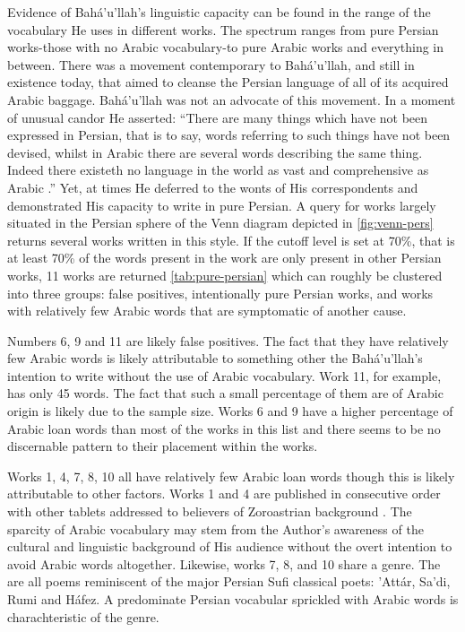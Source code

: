 \documentclass[12pt, oneside]{report}
\begin{document}
\par
Evidence of Bah\'{a}'u'llah's linguistic capacity can be found in the range of the vocabulary He uses in different works. The spectrum ranges from pure Persian works-those with no Arabic vocabulary-to pure Arabic works and everything in between. There was a movement contemporary to Bah\'{a}'u'llah, and still in existence today, that aimed to cleanse the Persian language of all of its acquired Arabic baggage. Bah\'{a}'u'llah was not an advocate of this movement. In a moment of unusual candor He asserted: ``There are many things which have not been expressed in Persian, that is to say, words referring to such things have not been devised, whilst in Arabic there are several words describing the same thing. Indeed there existeth no language in the world as vast and comprehensive as Arabic \cite{bahaullah_tabernacle_2006}.'' Yet, at times He deferred to the wonts of His correspondents and demonstrated His capacity to write in pure Persian. A query for works largely situated in the Persian sphere of the Venn diagram depicted in \autoref{fig:venn-pers} returns several works written in this style. If the cutoff level is set at 70\%, that is at least 70\% of the words present in the work are only present in other Persian works, 11 works are returned \ref{tab:pure-persian} which can roughly be clustered into three groups: false positives, intentionally pure Persian works, and works with relatively few Arabic words that are symptomatic of another cause.
\par
Numbers 6, 9 and 11 are likely false positives. The fact that they have relatively few Arabic words is likely attributable to something other the Bah\'{a}'u'llah's intention to write without the use of Arabic vocabulary. Work 11, for example, has only 45 words. The fact that such a small percentage of them are of Arabic origin is likely due to the sample size. Works 6 and 9 have a higher percentage of Arabic loan words than most of the works in this list and there seems to be no discernable pattern to their placement within the works.
\par
Works 1, 4, 7, 8, 10 all have relatively few Arabic loan words though this is likely attributable to other factors. Works 1 and 4 are published in consecutive order with other tablets addressed to believers of Zoroastrian background \cite{bahaullah_majmu`ih-i_1920}. The sparcity of Arabic vocabulary may stem from the Author's awareness of the cultural and linguistic background of His audience without the overt intention to avoid Arabic words altogether. Likewise, works 7, 8, and 10 share a genre. The are all poems reminiscent of the major Persian Sufi classical poets: 'Att\'{a}r, Sa'di, Rumi and H\'{a}fez. A predominate Persian vocabular sprickled with Arabic words is charachteristic of the genre.
\end{document}
